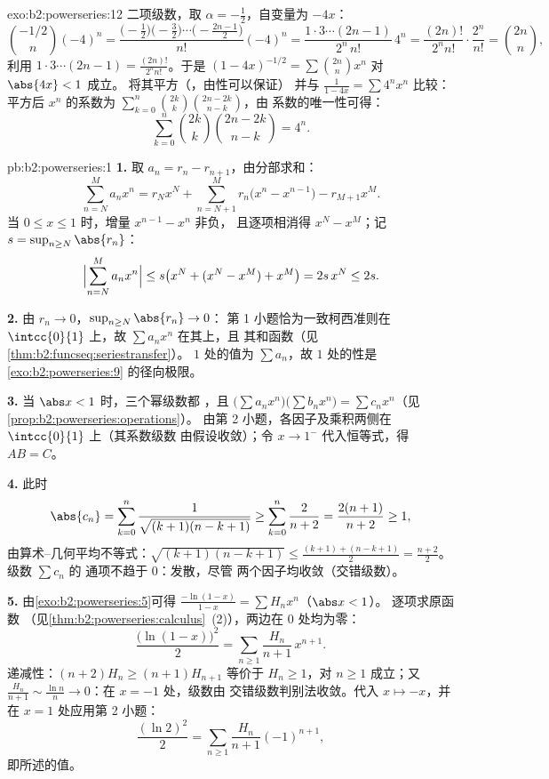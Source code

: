 \begin{solution}{exo:b2:powerseries:12}
二项级数，取 $\alpha = -\frac12$，自变量为 $-4x$：
\[
\binom{-1/2}{n}(-4)^n
= \frac{\bigl(-\frac12\bigr)\bigl(-\frac32\bigr)\cdots
\bigl(-\frac{2n-1}2\bigr)}{n!}(-4)^n
= \frac{1\cdot3\cdots(2n-1)}{2^n\,n!}\,4^n
= \frac{(2n)!}{2^n n!}\cdot\frac{2^n}{n!}
= \binom{2n}{n},
\]
利用 $1\cdot3\cdots(2n-1) = \frac{(2n)!}{2^nn!}$。于是
$(1-4x)^{-1/2} = \sum\binom{2n}nx^n$ 对 $\abs{4x} < 1$ 成立。
将其平方（，由性可以保证）
并与 $\frac{1}{1-4x} = \sum 4^nx^n$ 比较：
平方后 $x^n$ 的系数为
$\sum_{k=0}^n\binom{2k}k\binom{2n-2k}{n-k}$，由
系数的唯一性可得：
\[
\sum_{k=0}^{n}\binom{2k}{k}\binom{2n-2k}{n-k} = 4^n .
\]
\end{solution}

\begin{solution}{pb:b2:powerseries:1}
\textbf{1.} 取 $a_n = r_n - r_{n+1}$，由分部求和：
\[
\sum_{n=N}^{M} a_nx^n
= r_Nx^N + \sum_{n=N+1}^{M} r_n\bigl(x^n - x^{n-1}\bigr)
- r_{M+1}x^M .
\]
当 $0 \leq x \leq 1$ 时，增量 $x^{n-1} - x^n$ 非负，
且逐项相消得 $x^N - x^M$；记 $s = \sup_{n\geq
N}\abs{r_n}$：
\[
\Bigl|\sum_{n=N}^{M}a_nx^n\Bigr|
\leq s\bigl(x^N + (x^N - x^M) + x^M\bigr) = 2s\,x^N \leq 2s .
\]

\textbf{2.} 由 $r_n \to 0$，$\sup_{n\geq N}\abs{r_n} \to 0$：
第 1 小题恰为一致柯西准则在
$\intcc{0}{1}$ 上，故 $\sum a_nx^n$ 在其上，且
其和函数（见\cref{thm:b2:funcseq:seriestransfer}）。
$1$ 处的值为 $\sum a_n$，故 $1$ 处的性是
\cref{exo:b2:powerseries:9} 的径向极限。

\textbf{3.} 当 $\abs x < 1$ 时，三个幂级数都
，且 $\bigl(\sum a_nx^n\bigr)\bigl(\sum b_nx^n\bigr)
= \sum c_nx^n$（见\cref{prop:b2:powerseries:operations}）。
由第 2 小题，各因子及乘积两侧在
$\intcc{0}{1}$ 上（其系数级数
由假设收敛）；令 $x \to 1^-$ 代入恒等式，得 $AB = C$。

\textbf{4.} 此时
\[
\abs{c_n} = \sum_{k=0}^{n}
\frac{1}{\sqrt{(k+1)(n-k+1)}}
\geq \sum_{k=0}^{n}\frac{2}{n+2}
= \frac{2(n+1)}{n+2} \geq 1,
\]
由算术--几何平均不等式：$\sqrt{(k+1)(n-k+1)} \leq \frac{(k+1) +
(n-k+1)}{2} = \frac{n+2}{2}$。级数 $\sum c_n$ 的
通项不趋于 $0$：发散，尽管
两个因子均收敛（交错级数）。

\textbf{5.} 由\cref{exo:b2:powerseries:5}可得
$\frac{-\ln(1-x)}{1-x} = \sum H_nx^n$（$\abs x < 1$）。
逐项求原函数
（见\cref{thm:b2:powerseries:calculus}~(2)），两边在
$0$ 处均为零：
\[
\frac{\bigl(\ln(1-x)\bigr)^2}{2}
= \sum_{n\geq1}\frac{H_n}{n+1}\,x^{n+1} .
\]
递减性：$(n+2)H_n \geq (n+1)H_{n+1}$ 等价于 $H_n \geq
1$，对 $n \geq 1$ 成立；又 $\frac{H_n}{n+1} \sim \frac{\ln
n}{n} \to 0$：在 $x = -1$ 处，级数由
交错级数判别法收敛。代入 $x \mapsto -x$，并
在 $x = 1$ 处应用第 2 小题：
\[
\frac{(\ln 2)^2}{2}
= \sum_{n\geq1}\frac{H_n}{n+1}(-1)^{n+1},
\]
即所述的值。


\end{solution}
